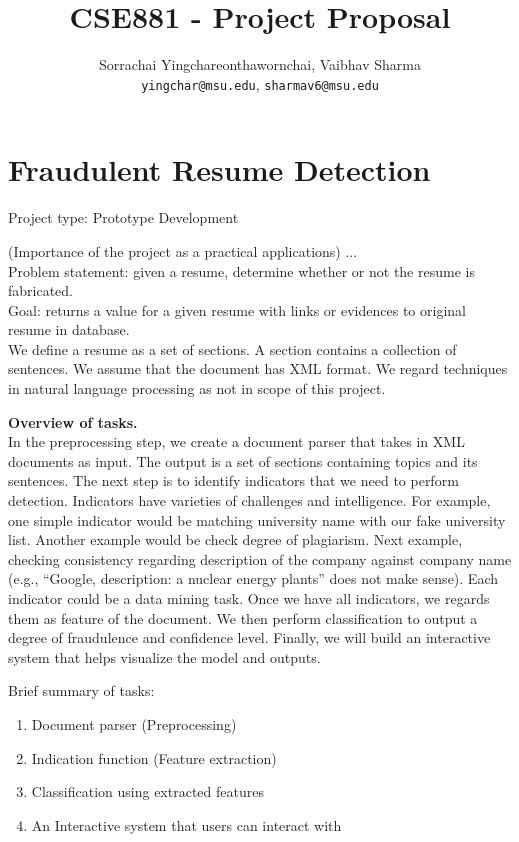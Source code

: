 \documentclass{article}
\title{CSE881 - Project Proposal}
\author{Sorrachai Yingchareonthawornchai, Vaibhav Sharma \\
 \texttt{yingchar@msu.edu}, \texttt{sharmav6@msu.edu}\\
}
\begin{document}
\maketitle
\section{Fraudulent Resume Detection}
Project type: Prototype Development

(Importance of the project as a practical applications) ...
\\
Problem statement: given a resume, determine whether or not the resume
is fabricated. \\
Goal: returns a value for a given resume with links or evidences to
original resume in database. \\

We define a resume as a set of sections. A section contains a collection of
sentences. We assume that the document has XML format. We regard
techniques in natural language processing as not in scope of this
project. 

\textbf{Overview of tasks.}\\
In the preprocessing step, we create a document parser that takes in
XML documents as input. The output is a set of sections containing
topics and its sentences.  The next step is to identify indicators
that we need to perform detection. Indicators have varieties of
challenges and intelligence. For example, one simple indicator would be matching
university name with our fake university list. Another example would
be check degree of plagiarism. Next example, checking consistency
regarding description of the company against company name (e.g.,
``Google, description: a nuclear energy plants'' does not make
sense). Each indicator could be a data mining task. Once we have
all indicators, we regards them as feature of the document. We then
perform classification to output a degree of fraudulence and
confidence level. Finally, we will build an interactive system that
helps visualize the model and outputs. 

Brief summary of tasks: 
\begin{enumerate}
\item Document parser (Preprocessing)
\item Indication function (Feature extraction)
\item Classification using extracted features
\item An Interactive system that users can interact with
\end{enumerate}
\end{document}
